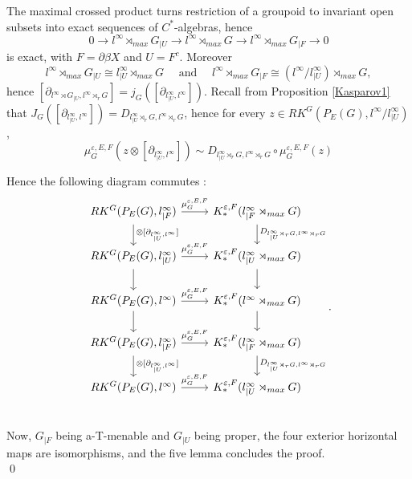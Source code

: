 \begin{dem}
The maximal crossed product turns restriction of a groupoid to invariant open subsets into exact sequences of $C^*$-algebras, hence  
\[0\rightarrow l^\infty \rtimes_{max} G_{|U} \rightarrow l^\infty \rtimes_{max} G \rightarrow l^\infty \rtimes_{max} G_{|F} \rightarrow 0\]
is exact, with $F=\partial\beta X$ and $U= F^c$. Moreover 
\[l^\infty \rtimes_{max} G_{|U}\cong l^\infty_{|U} \rtimes_{max} G
\quad \text{ and } \quad l^\infty \rtimes_{max} G_{|F}\cong (l^\infty/l^\infty_{|U}) \rtimes_{max} G,\] 
hence $[\partial_{l^\infty \rtimes G_{|U},l^\infty\rtimes_r G}]=j_G([\partial_{l^\infty_{|U},l^\infty}]) $. 
Recall from Proposition \ref{Kasparov1} that $J_G([\partial_{l^\infty_{|U},l^\infty}])=D_{l^\infty_{|U}\rtimes_r G,l^\infty \rtimes_r G}$, hence for every $z\in RK^G(P_E(G),l^\infty / l^\infty_{|U} )$, 
\[\mu_{G}^{\varepsilon,E,F}(z\otimes [\partial_{l^\infty_{|U},l^\infty}] ) 
\sim D_{l^\infty_{|U}\rtimes_r G,l^\infty \rtimes_r G} \circ \mu_{G}^{\varepsilon,E,F}(z )\]

Hence the following diagram commutes :
\[\begin{tikzcd}
RK^G(P_E(G),l^\infty_{|F}) \arrow{d}{\otimes[\partial_{l^\infty_{|U},l^\infty}]} \arrow{r}{\mu_{G}^{\varepsilon,E,F}} & K_*^{\varepsilon,F}(l^\infty_{|F} \rtimes_{max} G) \arrow{d}{D_{l^\infty_{|U}\rtimes_r G,l^\infty \rtimes_r G}} \\
RK^G(P_E(G),l^\infty_{|U} )\arrow{d}\arrow{r}{\mu_{G}^{\varepsilon,E,F}} & K_*^{\varepsilon,F}(l^\infty_{|U} \rtimes_{max} G) \arrow{d} \\
RK^G(P_E(G),l^\infty)      \arrow{d}\arrow{r}{\mu_{G}^{\varepsilon,E,F}} & K_*^{\varepsilon,F}(l^\infty \rtimes_{max} G)      \arrow{d} \\
RK^G(P_E(G),l^\infty_{|F}) \arrow{d}{\otimes[\partial_{l^\infty_{|U},l^\infty}]}\arrow{r}{\mu_{G}^{\varepsilon,E,F}} & K_*^{\varepsilon,F}(l^\infty_{|F} \rtimes_{max} G) \arrow{d}{D_{l^\infty_{|U}\rtimes_r G,l^\infty \rtimes_r G}} \\
RK^G(P_E(G),l^\infty)               \arrow{r}{\mu_{G}^{\varepsilon,E,F}} & K_*^{\varepsilon,F}(l^\infty_{|U} \rtimes_{max} G) \\
\end{tikzcd}.\]
Now, $G_{|F}$ being a-T-menable and $G_{|U}$ being proper, the four exterior horizontal maps are isomorphisms, and the five lemma concludes the proof.\\
\qed
\end{dem}

